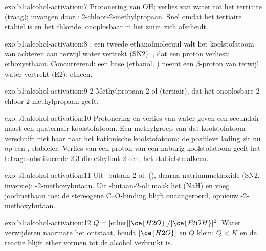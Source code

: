 \begin{solution}{exo:b1:alcohol-activation:7}
Protonering van OH; verlies van water tot het tertiaire 
(traag); invangen door : 2-chloor-2-methylpropaan. Snel omdat het
tertiaire  stabiel is en het chloride, onoplosbaar in het
zuur, zich afscheidt.
\end{solution}

\begin{solution}{exo:b1:alcohol-activation:8}
; een tweede ethanolmolecuul valt het
koolstofatoom van achteren aan terwijl water vertrekt (SN2):
, dat een proton verliest: ethoxyethaan. Concurrerend:
een base (ethanol, ) neemt een $\beta$-proton van
 terwijl water vertrekt (E2): etheen.
\end{solution}

\begin{solution}{exo:b1:alcohol-activation:9}
2-Methylpropaan-2-ol (tertiair), dat het onoplosbare
2-chloor-2-methylpropaan geeft.
\end{solution}

\begin{solution}{exo:b1:alcohol-activation:10}
Protonering en verlies van water geven een secundair  naast
een quaternair koolstofatoom. Een methylgroep van dat koolstofatoom
verschuift met haar  naar het kationische koolstofatoom: de
positieve lading zit nu op een , stabieler. Verlies
van een proton van een naburig koolstofatoom geeft het
tetragesubstitueerde 2,3-dimethylbut-2-een, het stabielste alkeen.
\end{solution}

\begin{solution}{exo:b1:alcohol-activation:11}
Uit -butaan-2-ol:  (), daarna natriummethoxide
(SN2, inversie): -2-methoxybutaan. Uit -butaan-2-ol: maak
het  (NaH) en voeg joodmethaan toe: de stereogene C--O-binding
blijft onaangeroerd, opnieuw -2-methoxybutaan.
\end{solution}

\begin{solution}{exo:b1:alcohol-activation:12}
$Q = [\text{ether}][\ce{H2O}]/[\ce{EtOH}]^2$. Water verwijderen naarmate
het ontstaat, houdt $[\ce{H2O}]$ en $Q$ klein: $Q < K$ en de reactie blijft
ether vormen tot de alcohol verbruikt is.
\end{solution}

